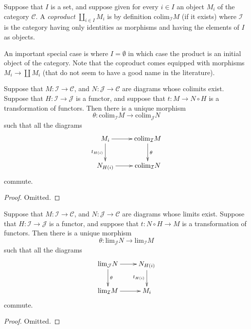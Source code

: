 \begin{definition}
\label{definition-coproduct}
Suppose that $I$ is a set, and suppose given for every $i \in I$ an
object $M_i$ of the category $\mathcal{C}$. A {\it coproduct}
$\coprod_{i\in I} M_i$ is by definition $\text{colim}_{\mathcal{I}} M$
(if it exists) where $\mathcal{I}$ is the category having only
identities as morphisms and having the elements of $I$ as objects.
\end{definition}

\noindent
An important special case is where $I = \emptyset$ in which case the
product is an initial object of the category.
Note that the coproduct comes equipped with morphisms
$M_i \to \coprod M_i$ (that do not seem to have a good
name in the literature).

\begin{lemma}
\label{lemma-functorial-colimit}
Suppose that $M : \mathcal{I} \to \mathcal{C}$,
and $N : \mathcal{J} \to \mathcal{C}$ are diagrams
whose colimits exist. Suppose that
$H : \mathcal{I} \to \mathcal{J}$ is 
a functor, and suppose that $t : M \to N \circ H$
is a transformation of functors. 
Then there is a unique morphism
$$
\theta :
\text{colim}_{\mathcal{I}} M
\longrightarrow
\text{colim}_{\mathcal{J}} N
$$
such that all the diagrams
$$
\xymatrix{
M_i \ar[d]_{t_{H(i)}} \ar[r]
&
\text{colim}_{\mathcal{I}} M \ar[d]^{\theta}
\\
N_{H(i)} \ar[r]
&
\text{colim}_{\mathcal{I}} N
}
$$
commute.
\end{lemma}

\begin{proof}
Omitted.
\end{proof}

\begin{lemma}
\label{lemma-functorial-limit}
Suppose that $M : \mathcal{I} \to \mathcal{C}$,
and $N : \mathcal{J} \to \mathcal{C}$ are diagrams
whose limits exist. Suppose that
$H : \mathcal{I} \to \mathcal{J}$ is 
a functor, and suppose that $t : N \circ H \to M$
is a transformation of functors. 
Then there is a unique morphism
$$
\theta :
\text{lim}_{\mathcal{J}} N
\longrightarrow
\text{lim}_{\mathcal{I}} M
$$
such that all the diagrams
$$
\xymatrix{
\text{lim}_{\mathcal{J}} N \ar[d]^{\theta} \ar[r]
&
N_{H(i)} \ar[d]_{t_{H(i)}}
\\
\text{lim}_{\mathcal{I}} M \ar[r]
&
M_i
}
$$
commute.
\end{lemma}

\begin{proof}
Omitted.
\end{proof}


